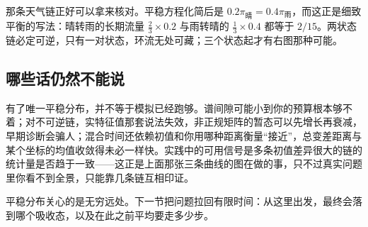那条天气链正好可以拿来核对。平稳方程化简后是 \(0.2\pi_{\text{晴}}=0.4\pi_{\text{雨}}\)，而这正是细致平衡的写法：晴转雨的长期流量 \(\tfrac23\times0.2\) 与雨转晴的 \(\tfrac13\times0.4\) 都等于 \(2/15\)。两状态链必定可逆，只有一对状态，环流无处可藏；三个状态起才有右图那种可能。

\subsection{哪些话仍然不能说}

有了唯一平稳分布，并不等于模拟已经跑够。谱间隙可能小到你的预算根本够不着；对不可逆链，实特征值那套说法失效，非正规矩阵的暂态可以先增长再衰减，早期诊断会骗人；混合时间还依赖初值和你用哪种距离衡量``接近''，总变差距离与某个坐标的均值收敛得未必一样快。实践中的可用信号是多条初值差异很大的链的统计量是否趋于一致——这正是上面那张三条曲线的图在做的事，只不过真实问题里你看不到全景，只能靠几条链互相印证。

平稳分布关心的是无穷远处。下一节把问题拉回有限时间：从这里出发，最终会落到哪个吸收态，以及在此之前平均要走多少步。
